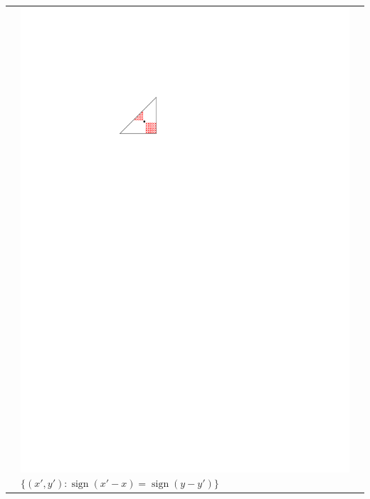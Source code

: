 \documentclass{patmorin}
\DeclareMathOperator{\sign}{sign}
\begin{document}
\begin{table}
\begin{center}
\begin{tabular}{m{1ex}|>{\centering\arraybackslash}m{}|>{\centering\arraybackslash}m{}}
         &  \includegraphics[scale=.9]{figs/killersb-4} \break%
            $\{(x',y'):\sign(x'-x)=\sign(y-y')\}$ \\

\end{tabular}
\end{center}
\end{table}
\end{document}
